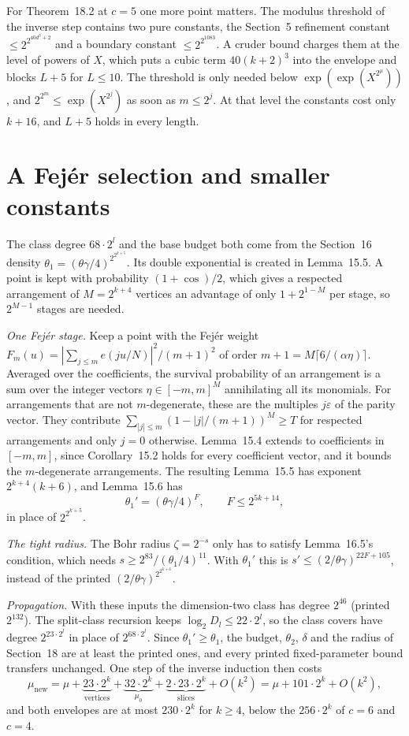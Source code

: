 \documentclass[11pt]{article}
\theoremstyle{definition}
\theoremstyle{remark}
\begin{document}
For Theorem~18.2 at $c=5$ one more point matters. The modulus threshold of
the inverse step contains two pure constants, the Section~5 refinement
constant $\le2^{2^{40d^3+2}}$ and a boundary constant $\le2^{2^{1083}}$. A
cruder bound charges them at the level of powers of $X$, which puts a cubic
term $40(k+2)^3$ into the envelope and blocks $L+5$ for $L\le10$. The
threshold is only needed below $\exp(\exp(X^{2^\mu}))$, and
$2^{2^m}\le\exp(X^{2^j})$ as soon as $m\le2^j$. At that level the
constants cost only $k+16$, and $L+5$ holds in every length.

\section{A Fej\'er selection and smaller constants}\label{sec:fejer}

The class degree $68\cdot2^l$ and the base budget both come from the
Section~16 density $\theta_1=(\theta\gamma/4)^{2^{2^{k+5}}}$. Its double
exponential is created in Lemma~15.5. A point is kept with probability
$(1+\cos)/2$, which gives a respected arrangement of $M=2^{k+4}$ vertices an
advantage of only $1+2^{1-M}$ per stage, so $2^{M-1}$ stages are needed.

\emph{One Fej\'er stage.} Keep a point with the Fej\'er weight
$F_m(u)=|\sum_{j\le m}e(ju/N)|^2/(m+1)^2$ of order
$m+1=M\lceil6/(\alpha\eta)\rceil$. Averaged over the coefficients, the
survival probability of an arrangement is a sum over the integer vectors
$\eta\in[-m,m]^M$ annihilating all its monomials. For arrangements that are
not $m$-degenerate, these are the multiples $j\varepsilon$ of the parity
vector. They contribute $\sum_{|j|\le m}(1-|j|/(m+1))^M\ge T$ for respected
arrangements and only $j=0$ otherwise. Lemma~15.4 extends to coefficients in
$[-m,m]$, since Corollary~15.2 holds for every coefficient vector, and it
bounds the $m$-degenerate arrangements. The resulting Lemma~15.5 has exponent
$2^{k+4}(k+6)$, and Lemma~15.6 has
\[
  \theta_1'=(\theta\gamma/4)^{F},\qquad F\le2^{5k+14},
\]
in place of $2^{2^{k+5}}$.

\emph{The tight radius.} The Bohr radius $\zeta=2^{-s}$ only has to satisfy
Lemma~16.5's condition, which needs $s\ge2^{83}/(\theta_1/4)^{11}$. With
$\theta_1'$ this is $s'\le(2/\theta\gamma)^{22F+105}$, instead of the printed
$(2/\theta\gamma)^{2^{2^{k+6}}}$.

\emph{Propagation.} With these inputs the dimension-two class has degree
$2^{46}$ (printed $2^{132}$). The split-class recursion keeps
$\log_2D_l\le22\cdot2^l$, so the class covers have degree $2^{23\cdot2^l}$
in place of $2^{68\cdot2^l}$. Since $\theta_1'\ge\theta_1$, the budget, $\theta_2$, $\delta$
and the radius of Section~18 are at least the printed ones, and every printed
fixed-parameter bound transfers unchanged. One step of the inverse induction
then costs
\[
  \mu_{\mathrm{new}}=\mu+\underbrace{23\cdot2^k}_{\text{vertices}}
  +\underbrace{32\cdot2^k}_{\mu_0}+\underbrace{2\cdot23\cdot2^k}_{\text{slices}}
  +O(k^2)=\mu+101\cdot2^k+O(k^2),
\]
and both envelopes are at most $230\cdot2^k$ for $k\ge4$, below the
$256\cdot2^k$ of $c=6$ and $c=4$.
\end{document}
